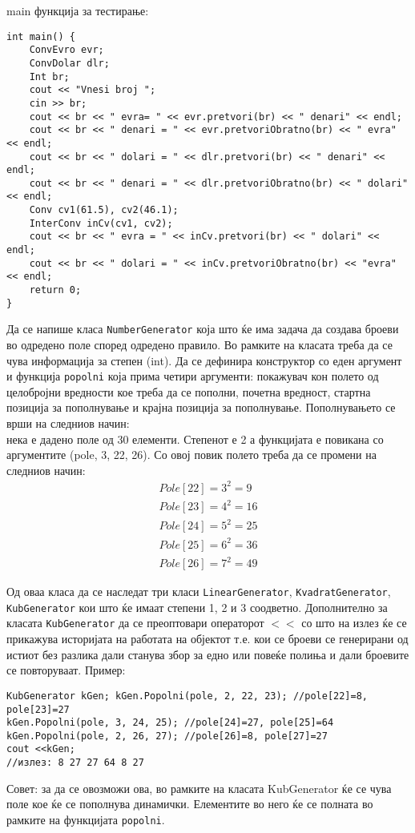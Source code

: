 \documentclass[12pt,a4paper]{exam}
\begin{document}
\begin{questions}
main функција за тестирање:
\begin{lstlisting}
int main() {
    ConvEvro evr;
    ConvDolar dlr;
    Int br;
    cout << "Vnesi broj ";
    cin >> br;
    cout << br << " evra= " << evr.pretvori(br) << " denari" << endl;
    cout << br << " denari = " << evr.pretvoriObratno(br) << " evra" << endl;
    cout << br << " dolari = " << dlr.pretvori(br) << " denari" << endl;
    cout << br << " denari = " << dlr.pretvoriObratno(br) << " dolari" << endl;
    Conv cv1(61.5), cv2(46.1);
    InterConv inCv(cv1, cv2);
    cout << br << " evra = " << inCv.pretvori(br) << " dolari" << endl;
    cout << br << " dolari = " << inCv.pretvoriObratno(br) << "evra" << endl;
    return 0;
}
\end{lstlisting}

\question
Да се напише класа \texttt{NumberGenerator} која што ќе има задача да создава
броеви во одредено поле според одредено правило. Во рамките на класата треба да се чува
информација за степен (int). Да се дефинира конструктор со еден аргумент и
функција \texttt{popolni} која прима четири аргументи: покажувач кон полето од
целобројни вредности кое треба да се пополни, почетна вредност, стартна позиција
за пополнување и крајна позиција за пополнување. Пополнувањето се врши на
следниов начин: \\
нека е дадено поле од 30 елементи. Степенот е 2 а функцијата е повикана со
аргументите (pole, 3, 22, 26). Со овој повик полето треба да се промени на
следниов начин:\\
\[
\begin{array}{l}
Pole[22]=3^2=9\\
Pole[23]=4^2=16\\
Pole[24]=5^2=25\\
Pole[25]=6^2=36\\
Pole[26]=7^2=49
\end{array}
\]

Од оваа класа да се наследат три класи \texttt{LinearGenerator},
\texttt{KvadratGenerator}, \texttt{KubGenerator} кои што ќе имаат степени 1, 2 и
3 соодветно. Дополнително за класата \texttt{KubGenerator} да се преоптовари
операторот $<<$ со што на излез ќе се прикажува историјата на работата на
објектот т.е. кои се броеви се генерирани од истиот без разлика дали станува
збор за едно или повеќе полиња и дали броевите се повторуваат. 
Пример:
\begin{verbatim}
KubGenerator kGen; kGen.Popolni(pole, 2, 22, 23); //pole[22]=8, pole[23]=27
kGen.Popolni(pole, 3, 24, 25); //pole[24]=27, pole[25]=64
kGen.Popolni(pole, 2, 26, 27); //pole[26]=8, pole[27]=27
cout <<kGen;
//излез: 8 27 27 64 8 27
\end{verbatim}
Совет: за да се овозможи ова, во рамките на класата KubGenerator ќе се чува поле кое ќе
се пополнува динамички. Елементите во него ќе се полната во рамките на
функцијата \texttt{popolni}. 


\end{questions}
\end{document}

